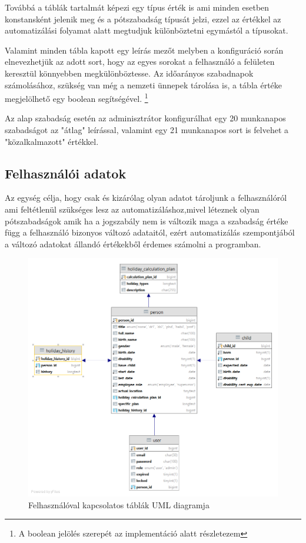 Továbbá a táblák tartalmát képezi egy típus érték is ami minden esetben konstansként jelenik meg és a pótszabadság típusát jelzi, ezzel az értékkel az automatizálási folyamat alatt megtudjuk különböztetni egymástól a típusokat.

Valamint minden tábla kapott egy leírás mezőt melyben a konfiguráció során elnevezhetjük az adott sort, hogy az egyes sorokat a felhasználó a felületen keresztül könnyebben megkülönböztesse.
\vskip 0.2in
Az időarányos szabadnapok számolásához, szükség van még a nemzeti ünnepek tárolása is, a tábla értéke megjelölhető egy boolean segítségével. \footnote{A boolean jelölés szerepét az implementáció alatt részletezem}

	Az alap szabadság esetén az adminisztrátor konfigurálhat egy 20 munkanapos szabadságot az "átlag" leírással, valamint egy 21 munkanapos sort is felvehet a "közalkalmazott" értékkel.


\subsection{Felhasználói adatok}

Az egység célja, hogy csak és kizárólag olyan adatot tároljunk a felhasználóról ami feltétlenül szükséges lesz az automatizáláshoz,mivel léteznek olyan pótszabadságok amik ha a jogszabály nem is változik maga a szabadság értéke függ a felhasználó bizonyos változó adataitól, ezért automatizálás szempontjából a változó adatokat állandó értékekből érdemes számolni a programban.

\begin{figure}[h]
	\centering
	\includegraphics[scale=0.4]{images/felhasznalotablak.png}
	\caption{Felhasználóval kapcsolatos táblák UML diagramja}
	\label{fig:felhasznaloUML}
\end{figure}

